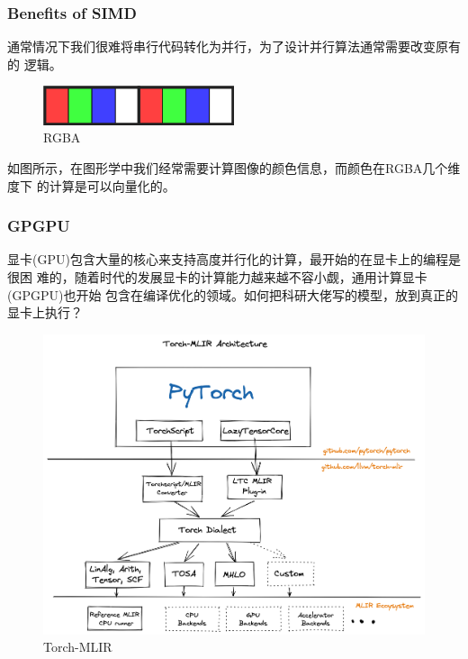 \documentclass[aspectratio=169]{ctexbeamer}
\begin{document}
\begin{frame}
    \frametitle{Benefits of SIMD}

    通常情况下我们很难将串行代码转化为并行，为了设计并行算法通常需要改变原有的
    逻辑。

    \begin{figure}[h]
        \centering
        \includegraphics[width=0.5\textwidth]{images/rgba.png}
        \caption{RGBA}
    \end{figure}

    如图所示，在图形学中我们经常需要计算图像的颜色信息，而颜色在RGBA几个维度下
    的计算是可以向量化的。

\end{frame}


\begin{frame}
    \frametitle{GPGPU}

    显卡(GPU)包含大量的核心来支持高度并行化的计算，最开始的在显卡上的编程是很困
    难的，随着时代的发展显卡的计算能力越来越不容小觑，通用计算显卡(GPGPU)也开始
    包含在编译优化的领域。如何把科研大佬写的模型，放到真正的显卡上执行？

    \begin{figure}[h]
        \centering
        \includegraphics[height=0.5\textheight]{images/torch-mlir.png}
        \caption{Torch-MLIR}
    \end{figure}

\end{frame}
\end{document}
